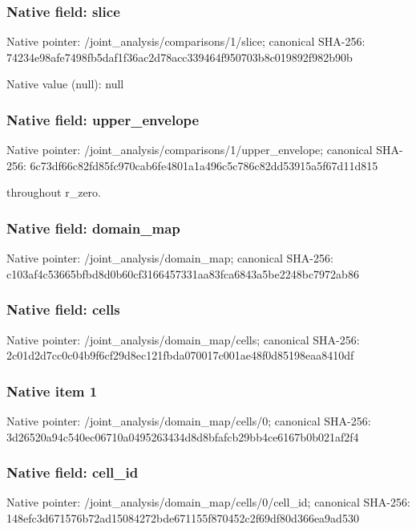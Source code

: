 \documentclass[10pt,a4paper]{article}
\begin{document}
\subsubsection{Native field: slice}
Native pointer: /joint\_\allowbreak{}analysis/comparisons/1/slice; canonical SHA-256: 74234e98afe7498fb5daf1f36ac2d78acc339464f950703b8c019892f982b90b

Native value (null): null

\subsubsection{Native field: upper\_\allowbreak{}envelope}
Native pointer: /joint\_\allowbreak{}analysis/comparisons/1/upper\_\allowbreak{}envelope; canonical SHA-256: 6c73df66c82fd85fc970cab6fe4801a1a496c5c786c82dd53915a5f67d11d815

\begingroup\raggedright{} throughout r\_\allowbreak{}zero.\par\endgroup

\subsubsection{Native field: domain\_\allowbreak{}map}
Native pointer: /joint\_\allowbreak{}analysis/domain\_\allowbreak{}map; canonical SHA-256: c103af4c53665bfbd8d0b60cf3166457331aa83fca6843a5be2248bc7972ab86

\subsubsection{Native field: cells}
Native pointer: /joint\_\allowbreak{}analysis/domain\_\allowbreak{}map/cells; canonical SHA-256: 2c01d2d7cc0c04b9f6cf29d8ec121fbda070017c001ae48f0d85198eaa8410df

\subsubsection{Native item 1}
Native pointer: /joint\_\allowbreak{}analysis/domain\_\allowbreak{}map/cells/0; canonical SHA-256: 3d26520a94c540ec06710a0495263434d8d8bfafcb29bb4ce6167b0b021af2f4

\subsubsection{Native field: cell\_\allowbreak{}id}
Native pointer: /joint\_\allowbreak{}analysis/domain\_\allowbreak{}map/cells/0/cell\_\allowbreak{}id; canonical SHA-256: 148efc3d671576b72ad15084272bde671155f870452c2f69df80d366ea9ad530
\end{document}
